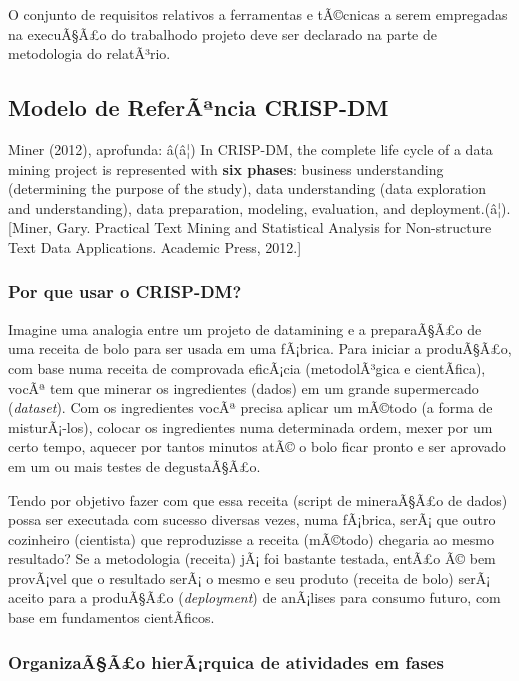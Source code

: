 \documentclass[]{article}
\begin{document}
O conjunto de requisitos relativos a ferramentas e tÃ©cnicas a serem
empregadas na execuÃ§Ã£o do trabalhodo projeto deve ser declarado na
parte de metodologia do relatÃ³rio.

\subsection{Modelo de ReferÃªncia
CRISP-DM}\label{modelo-de-referancia-crisp-dm}

Miner (2012), aprofunda: â(â¦) In CRISP-DM, the complete life cycle
of a data mining project is represented with \textbf{six phases}:
business understanding (determining the purpose of the study), data
understanding (data exploration and understanding), data preparation,
modeling, evaluation, and deployment.(â¦). {[}Miner, Gary. Practical
Text Mining and Statistical Analysis for Non-structure Text Data
Applications. Academic Press, 2012.{]}

\subsubsection{Por que usar o CRISP-DM?}\label{por-que-usar-o-crisp-dm}

Imagine uma analogia entre um projeto de datamining e a preparaÃ§Ã£o de
uma receita de bolo para ser usada em uma fÃ¡brica. Para iniciar a
produÃ§Ã£o, com base numa receita de comprovada eficÃ¡cia (metodolÃ³gica
e cientÃ­fica), vocÃª tem que minerar os ingredientes (dados) em um
grande supermercado (\emph{dataset}). Com os ingredientes vocÃª precisa
aplicar um mÃ©todo (a forma de misturÃ¡-los), colocar os ingredientes
numa determinada ordem, mexer por um certo tempo, aquecer por tantos
minutos atÃ© o bolo ficar pronto e ser aprovado em um ou mais testes de
degustaÃ§Ã£o.

Tendo por objetivo fazer com que essa receita (script de mineraÃ§Ã£o de
dados) possa ser executada com sucesso diversas vezes, numa fÃ¡brica,
serÃ¡ que outro cozinheiro (cientista) que reproduzisse a receita
(mÃ©todo) chegaria ao mesmo resultado? Se a metodologia (receita) jÃ¡
foi bastante testada, entÃ£o Ã© bem provÃ¡vel que o resultado serÃ¡ o
mesmo e seu produto (receita de bolo) serÃ¡ aceito para a produÃ§Ã£o
(\emph{deployment}) de anÃ¡lises para consumo futuro, com base em
fundamentos cientÃ­ficos.

\subsubsection{OrganizaÃ§Ã£o hierÃ¡rquica de atividades em
fases}\label{organizaaao-hierarquica-de-atividades-em-fases}
\end{document}
